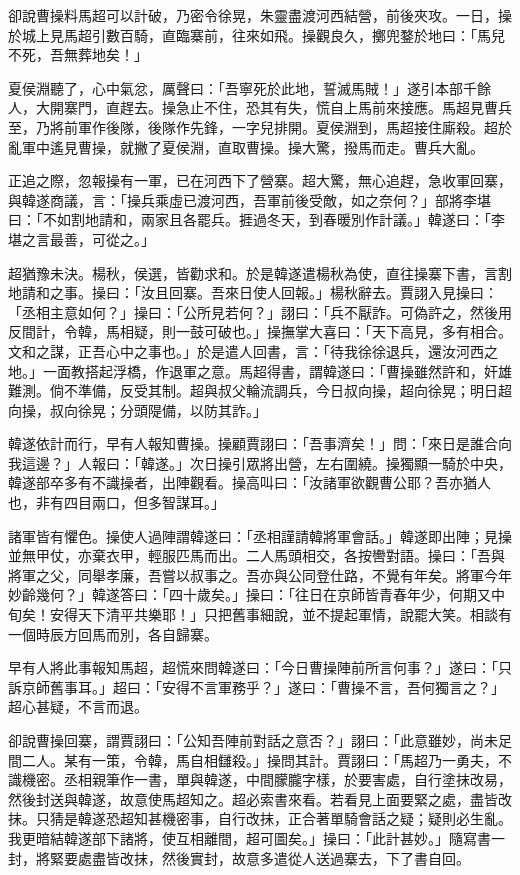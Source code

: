 卻說曹操料馬超可以計破，乃密令徐晃，朱靈盡渡河西結營，前後夾攻。一日，操於城上見馬超引數百騎，直臨寨前，往來如飛。操觀良久，擲兜鍪於地曰：「馬兒不死，吾無葬地矣！」

夏侯淵聽了，心中氣忿，厲聲曰：「吾寧死於此地，誓滅馬賊！」遂引本部千餘人，大開寨門，直趕去。操急止不住，恐其有失，慌自上馬前來接應。馬超見曹兵至，乃將前軍作後隊，後隊作先鋒，一字兒排開。夏侯淵到，馬超接住廝殺。超於亂軍中遙見曹操，就撇了夏侯淵，直取曹操。操大驚，撥馬而走。曹兵大亂。

正追之際，忽報操有一軍，已在河西下了營寨。超大驚，無心追趕，急收軍回寨，與韓遂商議，言：「操兵乘虛已渡河西，吾軍前後受敵，如之奈何？」部將李堪曰：「不如割地請和，兩家且各罷兵。捱過冬天，到春暖別作計議。」韓遂曰：「李堪之言最善，可從之。」

超猶豫未決。楊秋，侯選，皆勸求和。於是韓遂遣楊秋為使，直往操寨下書，言割地請和之事。操曰：「汝且回寨。吾來日使人回報。」楊秋辭去。賈詡入見操曰：「丞相主意如何？」操曰：「公所見若何？」詡曰：「兵不厭詐。可偽許之，然後用反間計，令韓，馬相疑，則一鼓可破也。」操撫掌大喜曰：「天下高見，多有相合。文和之謀，正吾心中之事也。」於是遣人回書，言：「待我徐徐退兵，還汝河西之地。」一面教搭起浮橋，作退軍之意。馬超得書，謂韓遂曰：「曹操雖然許和，奸雄難測。倘不準備，反受其制。超與叔父輪流調兵，今日叔向操，超向徐晃；明日超向操，叔向徐晃；分頭隄備，以防其詐。」

韓遂依計而行，早有人報知曹操。操顧賈詡曰：「吾事濟矣！」問：「來日是誰合向我這邊？」人報曰：「韓遂。」次日操引眾將出營，左右圍繞。操獨顯一騎於中央，韓遂部卒多有不識操者，出陣觀看。操高叫曰：「汝諸軍欲觀曹公耶？吾亦猶人也，非有四目兩口，但多智謀耳。」

諸軍皆有懼色。操使人過陣謂韓遂曰：「丞相謹請韓將軍會話。」韓遂即出陣；見操並無甲仗，亦棄衣甲，輕服匹馬而出。二人馬頭相交，各按轡對語。操曰：「吾與將軍之父，同舉孝廉，吾嘗以叔事之。吾亦與公同登仕路，不覺有年矣。將軍今年妙齡幾何？」韓遂答曰：「四十歲矣。」操曰：「往日在京師皆青春年少，何期又中旬矣！安得天下清平共樂耶！」只把舊事細說，並不提起軍情，說罷大笑。相談有一個時辰方回馬而別，各自歸寨。

早有人將此事報知馬超，超慌來問韓遂曰：「今日曹操陣前所言何事？」遂曰：「只訴京師舊事耳。」超曰：「安得不言軍務乎？」遂曰：「曹操不言，吾何獨言之？」超心甚疑，不言而退。

卻說曹操回寨，謂賈詡曰：「公知吾陣前對話之意否？」詡曰：「此意雖妙，尚未足間二人。某有一策，令韓，馬自相讎殺。」操問其計。賈詡曰：「馬超乃一勇夫，不識機密。丞相親筆作一書，單與韓遂，中間朦朧字樣，於要害處，自行塗抹改易，然後封送與韓遂，故意使馬超知之。超必索書來看。若看見上面要緊之處，盡皆改抹。只猜是韓遂恐超知甚機密事，自行改抹，正合著單騎會話之疑；疑則必生亂。我更暗結韓遂部下諸將，使互相離間，超可圖矣。」操曰：「此計甚妙。」隨寫書一封，將緊要處盡皆改抹，然後實封，故意多遣從人送過寨去，下了書自回。


